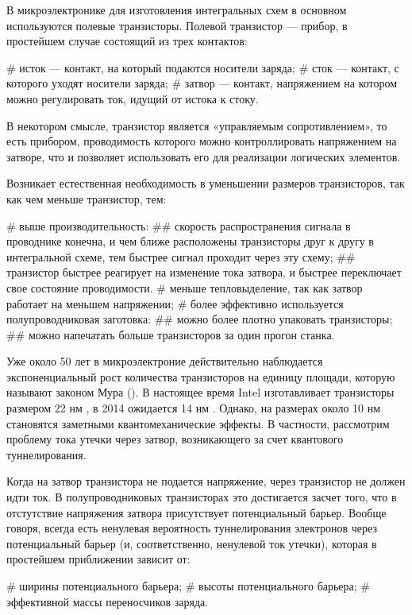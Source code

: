 \startprefacepage

В микроэлектронике для изготовления интегральных схем в основном используются полевые транзисторы. Полевой транзистор — прибор, в простейшем случае состоящий из трех контактов:
\begin{easylist}[itemize]
# исток — контакт, на который подаются носители заряда;
# сток — контакт, с которого уходят носители заряда;
# затвор — контакт, напряжением на котором можно регулировать ток, идущий от истока к стоку.
\end{easylist}
В некотором смысле, транзистор является «управляемым сопротивлением», то есть прибором, проводимость которого можно контроллировать напряжением на затворе, что и позволяет использовать его для реализации логических элементов.

Возникает естественная необходимость в уменьшении размеров транзисторов, так как чем меньше транзистор, тем:
\begin{easylist}[itemize]
# выше производительность:
## скорость распространения сигнала в проводнике конечна, и чем ближе расположены транзисторы друг к другу в интегральной схеме, тем быстрее сигнал проходит через эту схему;
## транзистор быстрее реагирует на изменение тока затвора, и быстрее переключает свое состояние проводимости.
# меньше тепловыделение, так как затвор работает на меньшем напряжении;
# более эффективно используется полупроводниковая заготовка:
## можно более плотно упаковать транзисторы;
## можно напечатать больше транзисторов за один прогон станка.
\end{easylist}

Уже около 50 лет в микроэлектроние действительно наблюдается экспоненциальный рост количества транзисторов на единицу площади, которую называют законом Мура (). В настоящее время Intel изготавливает транзисторы размером 22 нм \cite{intel_22_nm}, в 2014 ожидается 14 нм \cite{14_nm}. Однако, на размерах около 10 нм становятся заметными квантомеханические эффекты. В частности, рассмотрим проблему тока утечки через затвор, возникающего за счет квантового туннелирования.

Когда на затвор транзистора не подается напряжение, через транзистор не должен идти ток. В полупроводниковых транзисторах это достигается засчет того, что в отстутствие напряжения затвора присутствует потенциальный барьер. Вообще говоря, всегда есть ненулевая вероятность туннелирования электронов через потенциальный барьер (и, соответственно, ненулевой ток утечки), которая в простейшем приближении зависит от:
\begin{easylist}[itemize]
# ширины потенциального барьера;
# высоты потенциального барьера;
# эффективной массы переносчиков заряда. %
\end{easylist}

